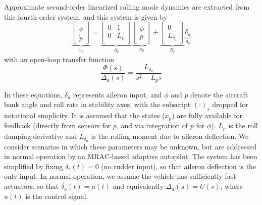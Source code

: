 Approximate second-order linearized rolling mode dynamics are extracted from this fourth-order system, and this system is given by
\begin{equation}
	\underbrace{\begin{bmatrix}
			\dot{\phi} \\ \dot{p}
		\end{bmatrix}}_{\dot{x}_p} = \underbrace{\begin{bmatrix}
			0 & 1 \\ 0 & L_p
		\end{bmatrix}}_{A_p} \underbrace{\begin{bmatrix}
			\phi \\ p
		\end{bmatrix}}_{x_p} + \underbrace{\begin{bmatrix}
			0 \\ L_{\delta_a}
		\end{bmatrix}}_{B_p} \underbrace{\delta_a}_{u_p}
	\label{eqn:2nd_order_lateral}
\end{equation} \noindent with an open-loop transfer function
\begin{equation}
		\frac{\Phi(s)}{\Delta_a(s)} = \frac{L_{\delta_a}}{s^2 - L_p s}
\end{equation}

In these equations, $\delta_a$ represents aileron input, and $\phi$ and $p$ denote the aircraft bank angle and roll rate in stability axes, with the subscript $(\cdot)_s$ dropped for notational simplicity. It is assumed that the states ($x_p$) are fully available for feedback (directly from sensors for $p$, and via integration of $p$ for $\phi$). $L_p$ is the roll damping derivative and $L_{\delta_a}$ is the rolling moment due to aileron deflection. We consider scenarios in which these parameters may be unknown, but are addressed in normal operation by an MRAC-based adaptive autopilot. The system has been simplified by fixing $\delta_r(t) = 0$ (no rudder input), so that aileron deflection is the only input. In normal operation, we assume the vehicle has sufficiently fast actuators, so that $\delta_a(t) = u(t)$ and equivalently $\Delta_a(s) = U(s)$, where $u(t)$ is the control signal. 

